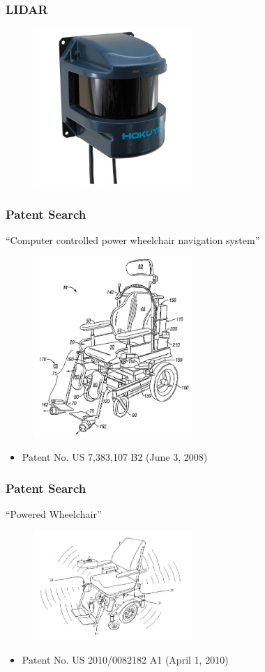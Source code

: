 \documentclass{beamer}
\begin{document}
\begin{frame}
  \frametitle{LIDAR}
  \begin{figure}
    \centering
    \includegraphics[width=6cm]{laser.jpg}
  \end{figure}
\end{frame}

\begin{frame}
  \frametitle{Patent Search}
  ``Computer controlled power wheelchair navigation system''
	\begin{figure}
		\centering
   		\includegraphics[width=6cm]{patents.png}
	\end{figure}
  \begin{itemize}
    \item Patent No. US 7,383,107 B2 (June 3, 2008) \\
  \end{itemize}
\end{frame}

\begin{frame}
  \frametitle{Patent Search}
  ``Powered Wheelchair''
	\begin{figure}
		\centering
   		\includegraphics[width=6cm]{patents2.png}
	\end{figure}
  \begin{itemize}
    \item Patent No. US 2010/0082182 A1 (April 1, 2010) \\
  \end{itemize}
\end{frame}
\end{document}
